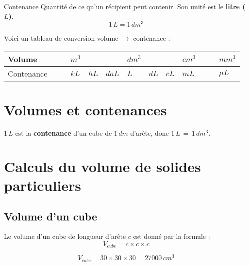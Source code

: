 \begin{pageCours}
\begin{DefT}{Contenance}
Quantité de ce qu'un récipient peut contenir. Son unité est le \textbf{litre ($L$)}.
\[1\,L=1\,dm^3\]
\end{DefT}

\begin{Mt}
Voici un tableau de conversion volume $\rightarrow$ contenance :
\begin{center}
\begin{tabular}{M{1.8cm}||M{.6cm}|M{.6cm}|M{.6cm}||M{.6cm}|M{.6cm}|M{.6cm}||M{.6cm}|M{.6cm}|M{.6cm}||M{.6cm}|M{.6cm}|M{.6cm}}
Volume & & & $m^3$ & & & $dm^3$ & & & $cm^3$ & & & $mm^3$\\\hline
Contenance & & & $kL$ & $hL$ & $daL$ & $L$ & $dL$ & $cL$ & $mL$ & & & $\mu L$ \\
\end{tabular}
\end{center}
\end{Mt}

\section{Volumes et contenances}

\begin{Pp}
$1\,L$ est la \textbf{contenance} d’un cube de $1\,dm$ d’arête, donc $1\,L\,=\,1\,dm^3$.
\end{Pp}

\section{Calculs du volume de solides particuliers}

\subsection{Volume d'un cube}

\begin{Pp}
Le volume d'un cube de longueur d'arête $c$
est donné par la formule :
\[V_{cube}=c\times c\times c\]

\begin{center}
\end{center}
\end{Pp}

\begin{Ex}
\begin{center}
\end{center}
\[V_{cube}=30\times30\times30=27000\,cm^3\]
\end{Ex}


\end{pageCours}
